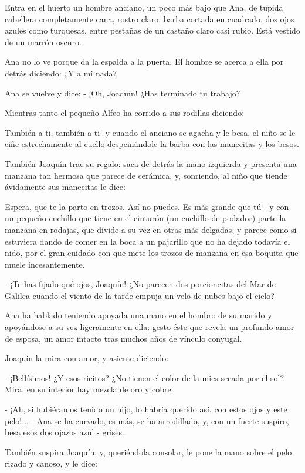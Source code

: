 \documentclass[12pt]{book} %
\begin{document}
Entra en el huerto un hombre anciano, un poco más bajo que Ana, de tupida cabellera completamente cana, rostro claro, barba cortada en cuadrado, dos ojos azules como turquesas, entre pestañas de un castaño claro casi rubio. Está vestido de un marrón oscuro. 

Ana no lo ve porque da la espalda a la puerta. El hombre se acerca a ella por detrás diciendo: ¿Y a mí nada? 

Ana se vuelve y dice:
- ¡Oh, Joaquín! ¿Has terminado tu trabajo? 

 Mientras tanto el pequeño Alfeo ha corrido a sus rodillas diciendo: 

También a ti, también a ti- y cuando el anciano se agacha y le besa, el niño se le ciñe estrechamente al cuello despeinándole la barba con las manecitas y los besos. 

También Joaquín trae su regalo: saca de detrás la mano izquierda y presenta una manzana tan hermosa que parece de cerámica, y, sonriendo, al niño que tiende ávidamente sus manecitas le dice: 

Espera, que te la parto en trozos. Así no puedes. Es más grande que tú - y con un pequeño cuchillo que tiene en el cinturón (un cuchillo de podador) parte la manzana en rodajas, que divide a su vez en otras más delgadas; y parece como si estuviera dando de comer en la boca a un pajarillo que no ha dejado todavía el nido, por el gran cuidado con que mete los trozos de manzana en esa boquita que muele incesantemente. 

- ¡Te has fijado qué ojos, Joaquín! ¿No parecen dos porcioncitas del Mar de Galilea cuando el viento de la tarde empuja un velo de nubes bajo el cielo? 

Ana ha hablado teniendo apoyada una mano en el hombro de su marido y apoyándose a su vez ligeramente en ella: gesto éste que revela un profundo amor de esposa, un amor intacto tras muchos años de vínculo conyugal. 

Joaquín la mira con amor, y asiente diciendo: 

- ¡Bellísimos! ¿Y esos ricitos? ¿No tienen el color de la mies secada por el sol? Mira, en su interior hay mezcla de oro y cobre. 

- ¡Ah, si hubiéramos tenido un hijo, lo habría querido así, con estos ojos y este pelo!... - Ana se ha curvado, es más, se ha arrodillado, y, con un fuerte suspiro, besa esos dos ojazos azul - grises. 

También suspira Joaquín, y, queriéndola consolar, le pone la mano sobre el pelo rizado y canoso, y le dice: 
\end{document}
